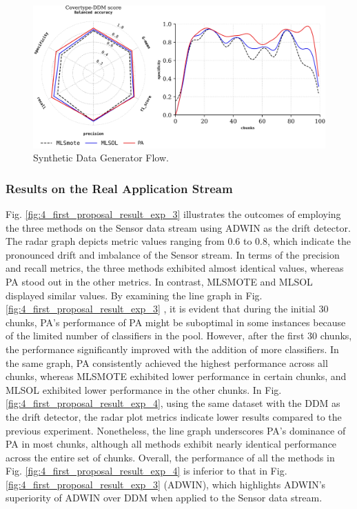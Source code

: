 \begin{figure}[!ht]
	\centering
	\includegraphics[width=1\linewidth]{4_Imbalanced/figures/exp_2.png}
	\caption{Synthetic Data Generator Flow.}
	\label{fig:4_first_proposal_result_exp_2}
\end{figure}

\subsubsection{Results on the Real Application Stream}
Fig. \ref{fig:4_first_proposal_result_exp_3} illustrates the outcomes of employing the three methods on the Sensor data stream using ADWIN as the drift detector. The radar graph depicts metric values ranging from 0.6 to 0.8, which indicate the pronounced drift and imbalance of the Sensor stream. In terms of the precision and recall metrics, the three methods exhibited almost identical values, whereas PA stood out in the other metrics. In contrast, MLSMOTE and MLSOL displayed similar values. By examining the line graph in Fig. \ref{fig:4_first_proposal_result_exp_3}
, it is evident that during the initial 30 chunks, PA's performance of PA might be suboptimal in some instances because of the limited number of classifiers in the pool. However, after the first 30 chunks, the performance significantly improved with the addition of more classifiers. In the same graph, PA consistently achieved the highest performance across all chunks, whereas MLSMOTE exhibited lower performance in certain chunks, and MLSOL exhibited lower performance in the other chunks. In Fig. \ref{fig:4_first_proposal_result_exp_4}, using the same dataset with the DDM as the drift detector, the radar plot metrics indicate lower results compared to the previous experiment. Nonetheless, the line graph underscores PA's dominance of PA in most chunks, although all methods exhibit nearly identical performance across the entire set of chunks. Overall, the performance of all the methods in Fig. \ref{fig:4_first_proposal_result_exp_4} is inferior to that in Fig. \ref{fig:4_first_proposal_result_exp_3} (ADWIN), which highlights ADWIN's superiority of ADWIN over DDM when applied to the Sensor data stream. 


